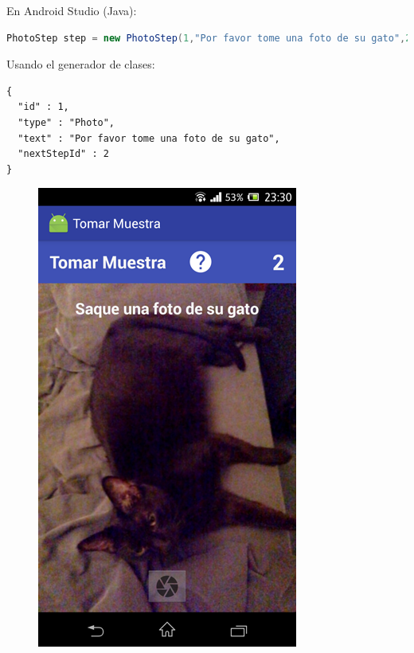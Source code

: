 En Android Studio (Java):
\begin{lstlisting}[language=Java, frame=tlb]	
PhotoStep step = new PhotoStep(1,"Por favor tome una foto de su gato",2);
\end{lstlisting}

Usando el generador de clases:
\begin{lstlisting}[language=XML, frame=tlb]	
{
  "id" : 1,
  "type" : "Photo",
  "text" : "Por favor tome una foto de su gato",
  "nextStepId" : 2
}
\end{lstlisting}

\begin{figure}[H]
  \centering
    \includegraphics[scale=0.4]{05-implementacion/PhotoStep1.png} 

\end{figure}
